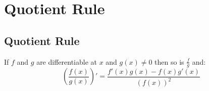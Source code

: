 \section{Quotient Rule}
\subsection{Quotient Rule}
	If $f$ and $g$ are differentiable at $x$ and $g(x) \neq 0$ then so is $\frac{f}{g}$ and:
	\begin{equation}\label{eq:2.4:quotientRule}
		\left( \frac{f(x)}{g(x)} \right)' = \frac{f'(x)g(x) - f(x)g'(x)}{\left( f(x) \right)^2}
	\end{equation}

